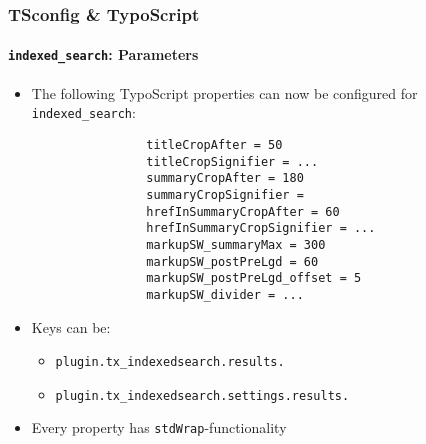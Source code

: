 %
\begin{frame}[fragile]
	\frametitle{TSconfig \& TypoScript}
	\framesubtitle{\texttt{indexed\_search}: Parameters}

	\lstset{basicstyle=\tiny\ttfamily}

	\begin{itemize}
		\item The following TypoScript properties can now be configured for \texttt{indexed\_search}:

			\begin{lstlisting}
				titleCropAfter = 50
				titleCropSignifier = ...
				summaryCropAfter = 180
				summaryCropSignifier =
				hrefInSummaryCropAfter = 60
				hrefInSummaryCropSignifier = ...
				markupSW_summaryMax = 300
				markupSW_postPreLgd = 60
				markupSW_postPreLgd_offset = 5
				markupSW_divider = ...
			\end{lstlisting}

		\item Keys can be:
			\begin{itemize}
				\item \texttt{plugin.tx\_indexedsearch.results.}
				\item \texttt{plugin.tx\_indexedsearch.settings.results.}
			\end{itemize}

		\item Every property has \texttt{stdWrap}-functionality

	\end{itemize}

\end{frame}

